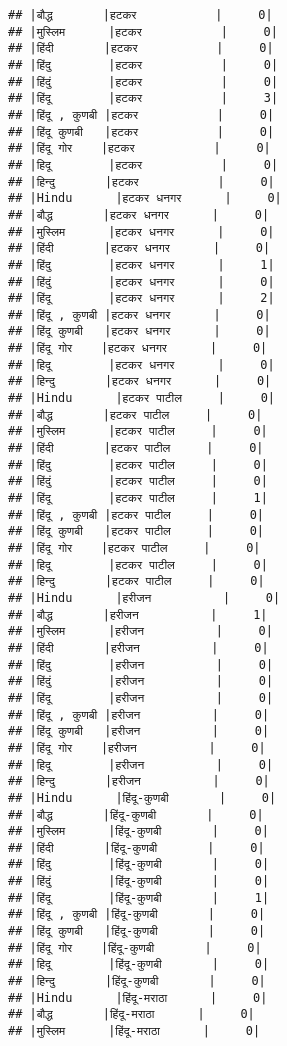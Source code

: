 \documentclass[
]{article}
\begin{document}
\begin{verbatim}
## |बौद्ध       |हटकर           |     0|
## |मुस्लिम      |हटकर           |     0|
## |हिंदी       |हटकर           |     0|
## |हिंदु        |हटकर           |     0|
## |हिंदुं        |हटकर           |     0|
## |हिंदू        |हटकर           |     3|
## |हिंदू , कुणबी |हटकर           |     0|
## |हिंदू कुणबी   |हटकर           |     0|
## |हिंदू गोर    |हटकर           |     0|
## |हिदू        |हटकर           |     0|
## |हिन्दु       |हटकर           |     0|
## |Hindu      |हटकर धनगर      |     0|
## |बौद्ध       |हटकर धनगर      |     0|
## |मुस्लिम      |हटकर धनगर      |     0|
## |हिंदी       |हटकर धनगर      |     0|
## |हिंदु        |हटकर धनगर      |     1|
## |हिंदुं        |हटकर धनगर      |     0|
## |हिंदू        |हटकर धनगर      |     2|
## |हिंदू , कुणबी |हटकर धनगर      |     0|
## |हिंदू कुणबी   |हटकर धनगर      |     0|
## |हिंदू गोर    |हटकर धनगर      |     0|
## |हिदू        |हटकर धनगर      |     0|
## |हिन्दु       |हटकर धनगर      |     0|
## |Hindu      |हटकर पाटील     |     0|
## |बौद्ध       |हटकर पाटील     |     0|
## |मुस्लिम      |हटकर पाटील     |     0|
## |हिंदी       |हटकर पाटील     |     0|
## |हिंदु        |हटकर पाटील     |     0|
## |हिंदुं        |हटकर पाटील     |     0|
## |हिंदू        |हटकर पाटील     |     1|
## |हिंदू , कुणबी |हटकर पाटील     |     0|
## |हिंदू कुणबी   |हटकर पाटील     |     0|
## |हिंदू गोर    |हटकर पाटील     |     0|
## |हिदू        |हटकर पाटील     |     0|
## |हिन्दु       |हटकर पाटील     |     0|
## |Hindu      |हरीजन          |     0|
## |बौद्ध       |हरीजन          |     1|
## |मुस्लिम      |हरीजन          |     0|
## |हिंदी       |हरीजन          |     0|
## |हिंदु        |हरीजन          |     0|
## |हिंदुं        |हरीजन          |     0|
## |हिंदू        |हरीजन          |     0|
## |हिंदू , कुणबी |हरीजन          |     0|
## |हिंदू कुणबी   |हरीजन          |     0|
## |हिंदू गोर    |हरीजन          |     0|
## |हिदू        |हरीजन          |     0|
## |हिन्दु       |हरीजन          |     0|
## |Hindu      |हिंदू-कुणबी       |     0|
## |बौद्ध       |हिंदू-कुणबी       |     0|
## |मुस्लिम      |हिंदू-कुणबी       |     0|
## |हिंदी       |हिंदू-कुणबी       |     0|
## |हिंदु        |हिंदू-कुणबी       |     0|
## |हिंदुं        |हिंदू-कुणबी       |     0|
## |हिंदू        |हिंदू-कुणबी       |     1|
## |हिंदू , कुणबी |हिंदू-कुणबी       |     0|
## |हिंदू कुणबी   |हिंदू-कुणबी       |     0|
## |हिंदू गोर    |हिंदू-कुणबी       |     0|
## |हिदू        |हिंदू-कुणबी       |     0|
## |हिन्दु       |हिंदू-कुणबी       |     0|
## |Hindu      |हिंदू-मराठा      |     0|
## |बौद्ध       |हिंदू-मराठा      |     0|
## |मुस्लिम      |हिंदू-मराठा      |     0|

\end{verbatim}
\end{document}
